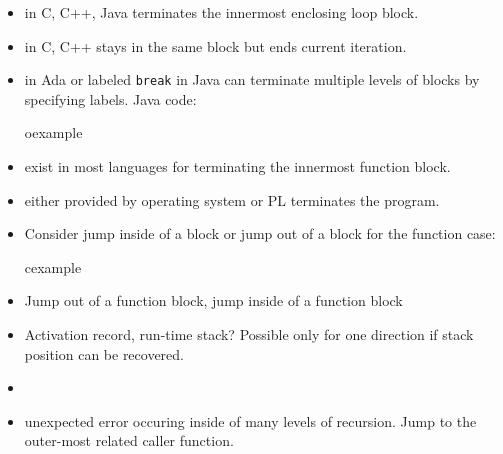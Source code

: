 \begin{frame}
\begin{itemize}
\item {} in C, C++, Java terminates the innermost
	enclosing loop block.
\item {} in C, C++ stays in the same block but ends current iteration.
\item {} in Ada or labeled \texttt{break} in Java can terminate
multiple levels of blocks by specifying labels. Java code:\\
\begin{beamercolorbox}{oexample}
\codejavaescapes
\end{beamercolorbox}
\end{itemize}
\end{frame}

\begin{frame}
\begin{itemize}
\item {} exist in most languages for terminating the innermost
function block.
\item {} either provided by operating system or PL terminates the
program.
\item Consider jump inside of a block or jump out of a block for the function case:
\begin{beamercolorbox}{cexample}
\codejumpfunc
\end{beamercolorbox}
\end{itemize}
\end{frame}

\begin{frame}
\begin{itemize}
\item Jump out  of a function block, jump inside of a function block
\item Activation record, run-time stack? Possible only for one direction
	if stack position can be recovered.
\item {}
\item unexpected error occuring inside of many levels of recursion. Jump to
	the outer-most related caller function. 
\end{itemize}
\end{frame}

